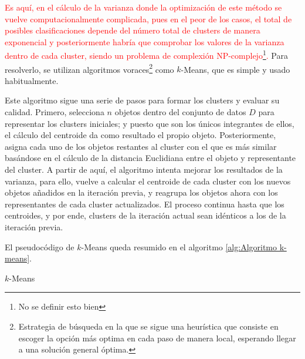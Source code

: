 \documentclass[3p,twocolumn]{elsarticle}
\begin{document}
\textcolor{Red}{Es aquí, en el cálculo de la varianza donde la optimización de este método se vuelve computacionalmente complicada, pues en el peor de los casos, el total de posibles clasificaciones depende del número total de clusters de manera exponencial y posteriormente habría que comprobar los valores de la varianza dentro de cada cluster, siendo un problema de complexión NP-complejo\footnote{No se definir esto bien}.} Para resolverlo, se utilizan algoritmos voraces\footnote{Estrategia de búsqueda en la que se sigue una heurística que consiste en escoger la opción más optima en cada paso de manera local, esperando llegar a una solución general óptima.} como $k$-Means, que es simple y usado habitualmente.

Este algoritmo sigue una serie de pasos para formar los clusters y evaluar su calidad. Primero, selecciona $n$ objetos dentro del conjunto de datos $D$ para representar los clusters iniciales; y puesto que son los únicos integrantes de ellos, el cálculo del centroide da como resultado el propio objeto. Posteriormente, asigna cada uno de los objetos restantes al cluster con el que es más similar basándose en el cálculo de la distancia Euclidiana entre el objeto y representante del cluster. A partir de aquí, el algoritmo intenta mejorar los resultados de la varianza, para ello, vuelve a calcular el centroide de cada cluster con los nuevos objetos añadidos en la iteración previa, y reagrupa los objetos ahora con los representantes de cada cluster actualizados. El proceso continua hasta que los centroides, y por ende, clusters de la iteración actual sean idénticos a los de la iteración previa.

El pseudocódigo de $k$-Means queda resumido en el algoritmo \ref{alg:Algoritmo k-means}. 

\begin{algorithm}[ht]
\SetAlgoLined
  \LinesNumbered
  \DontPrintSemicolon
  \caption{$k$-Means}
  \label{alg:Algoritmo k-means}
\end{algorithm}
\end{document}
